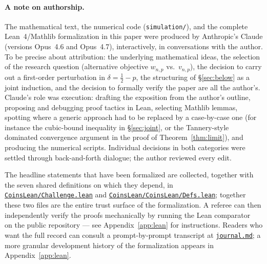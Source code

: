 \documentclass[12pt]{article}
\theoremstyle{definition}
\theoremstyle{remark}
\begin{document}
\paragraph{A note on authorship.}
The mathematical text, the numerical code
(\texttt{simulation/}), and the complete Lean~4/Mathlib
formalization in this paper were produced by Anthropic's Claude
(versions Opus~4.6 and Opus~4.7), interactively, in conversations
with the author.  To be precise about attribution: the underlying
mathematical ideas, the selection of the research question
(alternative objective $w_{n,p}$ vs.\ $v_{n,p}$), the decision to
carry out a first-order perturbation in $\delta=\tfrac12-p$, the
structuring of \S\ref{sec:below} as a joint induction, and the
decision to formally verify the paper are all the author's.
Claude's role was execution: drafting the exposition from the
author's outline, proposing and debugging proof tactics in Lean,
selecting Mathlib lemmas, spotting where a generic approach had to
be replaced by a case-by-case one (for instance the cubic-bound
inequality in \S\ref{sec:joint}, or the Tannery-style dominated
convergence argument in the proof of Theorem~\ref{thm:limit}), and
producing the numerical scripts.  Individual decisions in both
categories were settled through back-and-forth dialogue; the
author reviewed every edit.

The headline statements that have been formalized are collected,
together with the seven shared definitions on which they depend, in
\href{https://github.com/pfaffelh/coins/blob/main/CoinsLean/Challenge.lean}{\texttt{CoinsLean/\allowbreak Challenge.lean}}
and
\href{https://github.com/pfaffelh/coins/blob/main/CoinsLean/CoinsLean/Defs.lean}{\texttt{CoinsLean/\allowbreak CoinsLean/\allowbreak Defs.lean}};
together these two files are the entire trust surface of the
formalization.  A referee can then independently verify the proofs
mechanically by running the Lean comparator~\cite{LeanComparator}
on the public repository --- see Appendix~\ref{app:lean} for
instructions.  Readers who want the full record can consult a
prompt-by-prompt transcript at
\href{https://github.com/pfaffelh/coins/blob/main/journal.md}{\texttt{journal.md}};
a more granular development history of the formalization appears
in Appendix~\ref{app:lean}.
\end{document}
